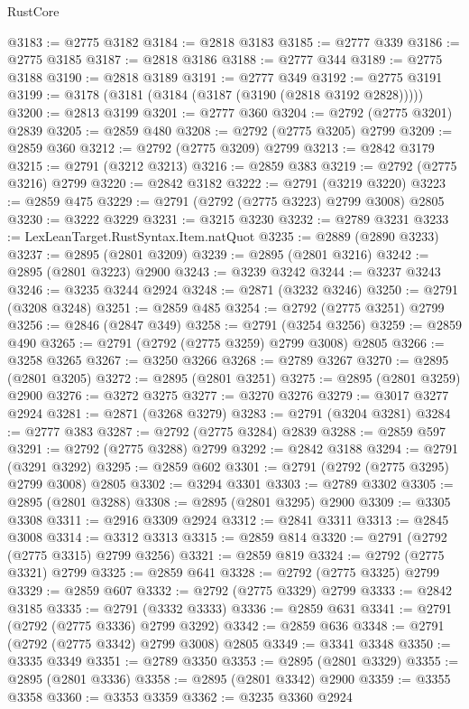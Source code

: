 \begin{lexlean}{RustCore}
\begin{coremodule}
@3183 := @2775 @3182
@3184 := @2818 @3183
@3185 := @2777 @339
@3186 := @2775 @3185
@3187 := @2818 @3186
@3188 := @2777 @344
@3189 := @2775 @3188
@3190 := @2818 @3189
@3191 := @2777 @349
@3192 := @2775 @3191
@3199 := @3178 (@3181 (@3184 (@3187 (@3190 (@2818 @3192 @2828)))))
@3200 := @2813 @3199
@3201 := @2777 @360
@3204 := @2792 (@2775 @3201) @2839
@3205 := @2859 @480
@3208 := @2792 (@2775 @3205) @2799
@3209 := @2859 @360
@3212 := @2792 (@2775 @3209) @2799
@3213 := @2842 @3179
@3215 := @2791 (@3212 @3213)
@3216 := @2859 @383
@3219 := @2792 (@2775 @3216) @2799
@3220 := @2842 @3182
@3222 := @2791 (@3219 @3220)
@3223 := @2859 @475
@3229 := @2791 (@2792 (@2775 @3223) @2799 @3008) @2805
@3230 := @3222 @3229
@3231 := @3215 @3230
@3232 := @2789 @3231
@3233 := LexLeanTarget.RustSyntax.Item.natQuot
@3235 := @2889 (@2890 @3233)
@3237 := @2895 (@2801 @3209)
@3239 := @2895 (@2801 @3216)
@3242 := @2895 (@2801 @3223) @2900
@3243 := @3239 @3242
@3244 := @3237 @3243
@3246 := @3235 @3244 @2924
@3248 := @2871 (@3232 @3246)
@3250 := @2791 (@3208 @3248)
@3251 := @2859 @485
@3254 := @2792 (@2775 @3251) @2799
@3256 := @2846 (@2847 @349)
@3258 := @2791 (@3254 @3256)
@3259 := @2859 @490
@3265 := @2791 (@2792 (@2775 @3259) @2799 @3008) @2805
@3266 := @3258 @3265
@3267 := @3250 @3266
@3268 := @2789 @3267
@3270 := @2895 (@2801 @3205)
@3272 := @2895 (@2801 @3251)
@3275 := @2895 (@2801 @3259) @2900
@3276 := @3272 @3275
@3277 := @3270 @3276
@3279 := @3017 @3277 @2924
@3281 := @2871 (@3268 @3279)
@3283 := @2791 (@3204 @3281)
@3284 := @2777 @383
@3287 := @2792 (@2775 @3284) @2839
@3288 := @2859 @597
@3291 := @2792 (@2775 @3288) @2799
@3292 := @2842 @3188
@3294 := @2791 (@3291 @3292)
@3295 := @2859 @602
@3301 := @2791 (@2792 (@2775 @3295) @2799 @3008) @2805
@3302 := @3294 @3301
@3303 := @2789 @3302
@3305 := @2895 (@2801 @3288)
@3308 := @2895 (@2801 @3295) @2900
@3309 := @3305 @3308
@3311 := @2916 @3309 @2924
@3312 := @2841 @3311
@3313 := @2845 @3008
@3314 := @3312 @3313
@3315 := @2859 @814
@3320 := @2791 (@2792 (@2775 @3315) @2799 @3256)
@3321 := @2859 @819
@3324 := @2792 (@2775 @3321) @2799
@3325 := @2859 @641
@3328 := @2792 (@2775 @3325) @2799
@3329 := @2859 @607
@3332 := @2792 (@2775 @3329) @2799
@3333 := @2842 @3185
@3335 := @2791 (@3332 @3333)
@3336 := @2859 @631
@3341 := @2791 (@2792 (@2775 @3336) @2799 @3292)
@3342 := @2859 @636
@3348 := @2791 (@2792 (@2775 @3342) @2799 @3008) @2805
@3349 := @3341 @3348
@3350 := @3335 @3349
@3351 := @2789 @3350
@3353 := @2895 (@2801 @3329)
@3355 := @2895 (@2801 @3336)
@3358 := @2895 (@2801 @3342) @2900
@3359 := @3355 @3358
@3360 := @3353 @3359
@3362 := @3235 @3360 @2924

\end{coremodule}
\end{lexlean}
